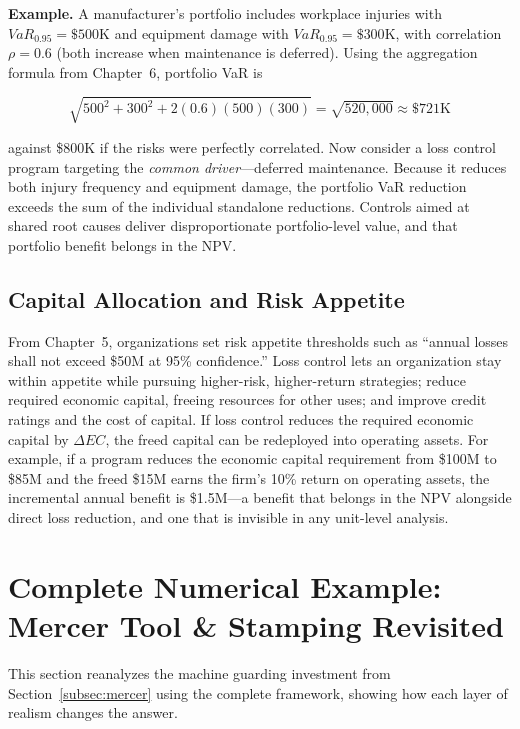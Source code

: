\documentclass[11pt,openany]{book}
\begin{document}
\textbf{Example.} A manufacturer's portfolio includes workplace injuries with
\(VaR_{0.95} = \$500\text{K}\) and equipment damage with
\(VaR_{0.95} = \$300\text{K}\), with correlation \(\rho = 0.6\) (both increase
when maintenance is deferred). Using the aggregation formula from Chapter~6,
portfolio VaR is

\[
\sqrt{500^2 + 300^2 + 2(0.6)(500)(300)} = \sqrt{520{,}000} \approx
\$721\text{K}
\]

against \$800K if the risks were perfectly correlated. Now consider a loss
control program targeting the \emph{common driver}---deferred maintenance.
Because it reduces both injury frequency and equipment damage, the portfolio
VaR reduction exceeds the sum of the individual standalone reductions.
Controls aimed at shared root causes deliver disproportionate portfolio-level
value, and that portfolio benefit belongs in the NPV.

\subsection{Capital Allocation and Risk Appetite}

From Chapter~5, organizations set risk appetite thresholds such as ``annual
losses shall not exceed \$50M at 95\% confidence.'' Loss control lets an
organization stay within appetite while pursuing higher-risk, higher-return
strategies; reduce required economic capital, freeing resources for other
uses; and improve credit ratings and the cost of capital. If loss control
reduces the required economic capital by \(\Delta EC\), the freed capital can
be redeployed into operating assets. For example, if a program reduces the
economic capital requirement from \$100M to \$85M and the freed \$15M earns
the firm's 10\% return on operating assets, the incremental annual benefit is
\$1.5M---a benefit that belongs in the NPV alongside direct loss reduction,
and one that is invisible in any unit-level analysis.

\section{Complete Numerical Example: Mercer Tool \& Stamping Revisited}
\label{sec:appendix-example}

This section reanalyzes the machine guarding investment from
Section~\ref{subsec:mercer} using the complete framework, showing how each
layer of realism changes the answer.
\end{document}
